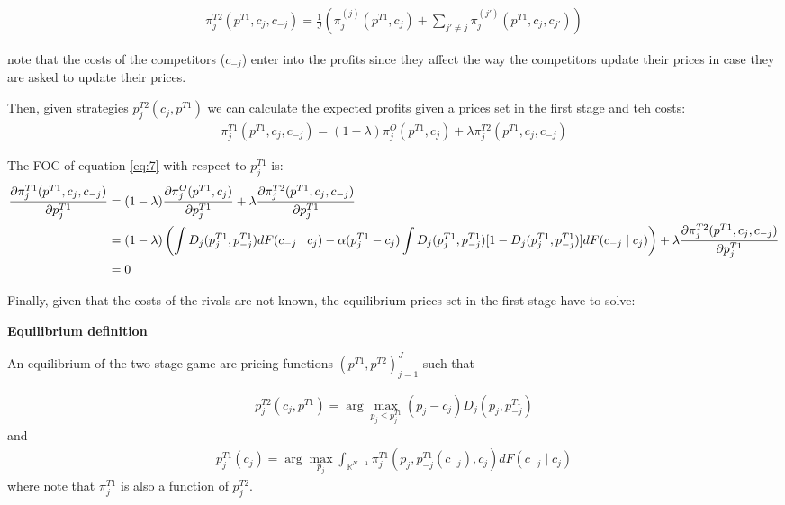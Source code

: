 \documentclass[12pt]{article}
\begin{document}
\begin{align}\label{eq:profits_external2} %
    \pi_j^{T2}(p^{T1}, c_j, c_{-j}) =  \frac{1}{J} \left( \pi_j^{(j)}(p^{T1}, c_j)   + \sum_{j'\neq j} \pi_j^{(j')}(p^{T1}, c_j, c_{j'}) \right)
\end{align}


note that the costs of the competitors ($c_{-j}$) enter into the profits since they affect the way the competitors update their prices in case they are asked to update their prices.

Then, given strategies  $p_j^{T2}(c_j, p^{T1})$ we can calculate the expected profits given a prices set in the first stage and teh costs: 
\begin{align}\label{eq:7} %
    \pi_j^{T1}(p^{T1}, c_j, c_{-j}) = (1-\lambda) \pi_j^O(p^{T1}, c_j) + \lambda \pi_j^{T2}(p^{T1}, c_j, c_{-j})
\end{align}


The FOC of equation \ref{eq:7} with respect to $p_j^{T1}$ is:
\begin{align}
    \frac{\partial \pi_j^{T1}(p^{T1}, c_j, c_{-j})}{\partial p_j^{T1}} &= (1-\lambda) \frac{\partial \pi_j^O(p^{T1}, c_j)}{\partial p_j^{T1}} + \lambda \frac{\partial \pi_j^{T2}(p^{T1}, c_j, c_{-j})}{\partial p_j^{T1}} \notag \\
    &= (1-\lambda) \left( \int D_j(p_j^{T1}, p_{-j}^{T1}) dF(c_{-j} \mid c_j) - \alpha (p_j^{T1} - c_j) \int D_j(p_j^{T1}, p_{-j}^{T1}) [1-D_j(p_j^{T1}, p_{-j}^{T1})] dF(c_{-j} \mid c_j) \right) + \lambda \frac{\partial \pi_j^{T2}(p^{T1}, c_j, c_{-j})}{\partial p_j^{T1}} \notag \\
    &= 0  
\end{align}


Finally, given that the costs of the rivals are not known, the equilibrium prices set in the first stage have to solve: 


\textbf{Equilibrium definition}

An equilibrium of the two stage game are pricing functions $(p^{T1}, p^{T2})_{j=1}^J$ such that 


\begin{align}\label{eq:eq_second_stage} %
    p_j^{T2}(c_j, p^{T1}) = \arg \max_{p_j \leq p_j^{T1}} (p_j - c_j) D_j(p_j, p_{-j}^{T1}) 
\end{align}
and 
\begin{align}\label{eq:eq_first_stage} %
    p_j^{T1}(c_j) = \arg \max_{p_j} \int_{\mathbb{R}^{N-1}}^{}  \pi_j^{T1}(p_j, p_{-j}^{T1}(c_{-j}), c_j) dF(c_{-j} \mid c_j)   
\end{align}
where note that $\pi_j^{T1}$ is also a function of $p_j^{T2}$. 
\end{document}
